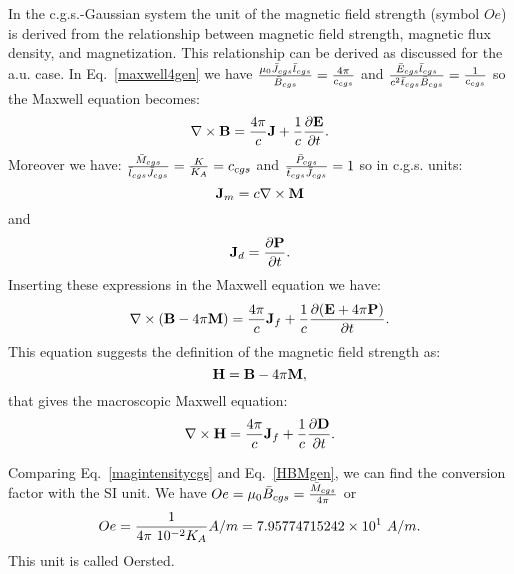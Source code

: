 \documentclass[12pt,a4paper]{article}
\def\htoh{7.95774715242\times 10^{1}}
\begin{document}
{\color{orange} In the c.g.s.-Gaussian system the unit of the magnetic field
strength (symbol $Oe$) is derived from the relationship between 
magnetic field strength,
magnetic flux density, and magnetization. This relationship can be derived
as discussed for the a.u. case. In Eq.~\ref{maxwell4gen} we have
${\mu_0 \bar J_{cgs} \bar l_{cgs} \over \bar B_{cgs}}={4 \pi \over c_{cgs}}$
and ${\bar E_{cgs} \bar l_{cgs} \over c^2 \bar t_{cgs} \bar B_{cgs}}=
{1\over c_{cgs}}$ so the Maxwell equation becomes:
\begin{equation}
\nabla \times {\bf B}= {4 \pi \over c} {\bf J} + {1\over c} 
{\partial {\bf E} \over \partial t}.
\label{maxwell4cgs}
\end{equation}
Moreover we have:
${\bar M_{cgs} \over \bar l_{cgs} \bar J_{cgs}}={K\over K_A}=c_{cgs}$ and
${\bar P_{cgs} \over \bar t_{cgs} \bar J_{cgs}}=1$ so in c.g.s. units:
\begin{equation}
{\bf J}_m= c \nabla \times {\bf M}
\end{equation}
and
\begin{equation}
{\bf J}_d={\partial {\bf P} \over \partial t}.
\end{equation}
Inserting these expressions in the Maxwell equation we have:
\begin{equation}
\nabla \times ({\bf B} -4\pi {\bf M})= 
{4 \pi\over c} {\bf J}_f +  {1\over c} {\partial ({\bf E}+4\pi {\bf P}) \over \partial t}.
\label{maxwell4cgs1}
\end{equation}
This equation suggests the definition of the magnetic field strength as:
\begin{equation}
{\bf H}={\bf B} -4\pi {\bf M},
\label{magintensitycgs}
\end{equation}
that gives the macroscopic Maxwell equation:
\begin{equation}
\nabla \times {\bf H}= 
{4 \pi \over c} {\bf J}_f +  {1\over c}{\partial {\bf D} \over \partial t}.
\end{equation}

Comparing Eq.~\ref{magintensitycgs} and Eq.~\ref{HBMgen}, we can find the 
conversion factor with the SI unit.
We have $Oe=\mu_0 \bar B_{cgs}={\bar M_{cgs} \over 4 \pi}$ or
\begin{equation}
Oe= {1\over 4 \pi\ 10^{-2} K_A} A/m=\htoh\ A/m. 
\end{equation}
This unit is called Oersted.
}
\\
\end{document}

